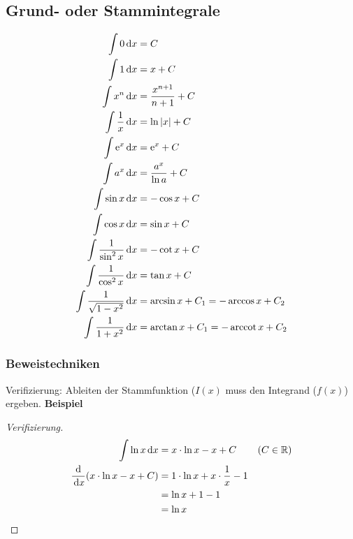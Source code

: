 \subsection{Grund- oder Stammintegrale}
\begin{align*}
	\int 0 \,\mathrm dx& = C \\ 
	\int 1 \,\mathrm dx& = x + C \\
	\int x^n \,\mathrm dx& = \frac{x^{n + 1}}{n + 1} + C \\
	\int \frac{1}{x} \,\mathrm dx& = \ln |x| + C\\
	\int \mathrm e^x \,\mathrm dx& = \mathrm e^x + C \\
	\int a^x \,\mathrm dx& = \frac{a^x}{\ln a} + C\\
	\int \sin x \,\mathrm dx& = - \cos x + C \\
	\int \cos x \,\mathrm dx& = \sin x + C\\
	\int \frac{1}{\sin^2 x} \,\mathrm dx& = - \cot x + C \\
	\int \frac{1}{\cos^2 x} \,\mathrm dx& = \tan x + C \\
 	\int \frac{1}{\sqrt{1 - x^2}} \,\mathrm dx& = \arcsin x + C_1 = -\arccos x + C_2 \\
 	\int \frac{1}{1 + x^2} \,\mathrm dx& = \arctan x + C_1 = -\operatorname{arccot} x + C_2\\
\end{align*}

\subsubsection{Beweistechniken}
Verifizierung: Ableiten der Stammfunktion ($I(x)$ muss den Integrand ($f(x)$) ergeben.
\textbf{Beispiel}
\begin{proof}[Verifizierung]
	\begin{align*}
		\int \ln x \,\mathrm dx& = x \cdot \ln x - x + C & (C \in \mathbb{R})\\
		\frac{\mathrm d}{\,\mathrm dx} (x \cdot \ln x - x + C) & = 1 \cdot \ln x + x \cdot \frac{1}{x} - 1\\
		& = \ln x + 1 - 1\\
		& = \ln x\qedhere
	\end{align*}
\end{proof}